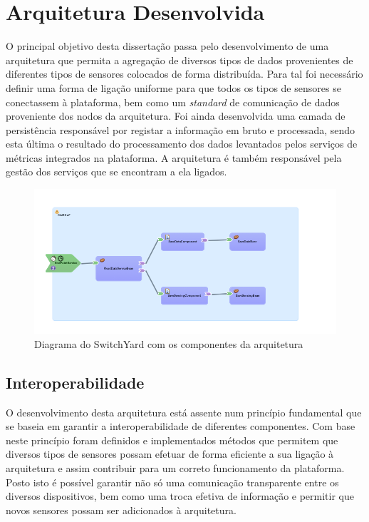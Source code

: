 \chapter{Arquitetura Desenvolvida}

O principal objetivo desta dissertação passa pelo desenvolvimento de uma arquitetura que permita a agregação de diversos tipos de dados provenientes de diferentes tipos de sensores colocados de forma distribuída. Para tal foi necessário definir uma forma de ligação uniforme para que todos os tipos de sensores se conectassem à plataforma, bem como um \textit{standard} de comunicação de dados proveniente dos nodos da arquitetura. Foi ainda desenvolvida uma camada de persistência responsável por registar a informação em bruto e processada, sendo esta última o resultado do processamento dos dados levantados pelos serviços de métricas integrados na plataforma. A arquitetura é também responsável pela gestão dos serviços que se encontram a ela ligados.

\begin{figure}[htb]
   \centering
   \includegraphics[scale=0.55]{Images/switchyard.png}
   \caption{Diagrama do SwitchYard com os componentes da arquitetura}
\end{figure}

\section{Interoperabilidade}

O desenvolvimento desta arquitetura está assente num princípio fundamental que se baseia em garantir a interoperabilidade de diferentes componentes. Com base neste princípio foram definidos e implementados métodos que permitem que diversos tipos de sensores possam efetuar de forma eficiente a sua ligação à arquitetura e assim contribuir para um correto funcionamento da plataforma. Posto isto é possível garantir não só uma comunicação transparente entre os diversos dispositivos, bem como uma troca efetiva de informação e permitir que novos sensores possam ser adicionados à arquitetura.

